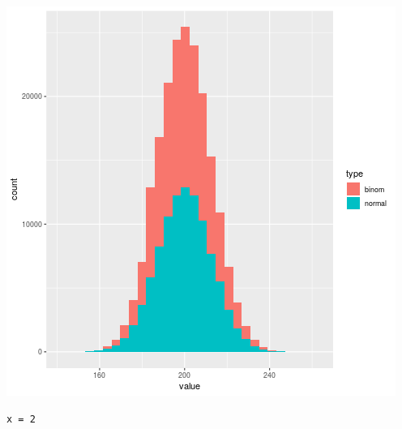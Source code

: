 \documentclass[11pt]{article}
\begin{document}
\begin{center}
\includegraphics[width=.9\linewidth]{test.png}
\end{center}



\begin{verbatim}
x = 2  
\end{verbatim}
\end{document}
